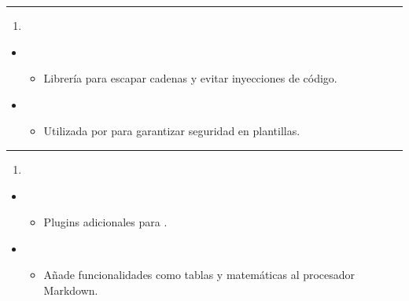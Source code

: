 \documentclass[a4paper,10pt,spanish]{sphinxmanual}
\begin{document}
\bigskip\hrule\bigskip

\begin{enumerate}
%
\setcounter{enumi}{10}
\item {} 
\sphinxAtStartPar
{}

\end{enumerate}
\begin{itemize}
\item {} 
\sphinxAtStartPar
{}
\begin{itemize}
\item {} 
\sphinxAtStartPar
Librería para escapar cadenas y evitar inyecciones de código.

\end{itemize}

\item {} 
\sphinxAtStartPar
{}
\begin{itemize}
\item {} 
\sphinxAtStartPar
Utilizada por  para garantizar seguridad en plantillas.

\end{itemize}

\end{itemize}


\bigskip\hrule\bigskip

\begin{enumerate}
%
\setcounter{enumi}{11}
\item {} 
\sphinxAtStartPar
{}

\end{enumerate}
\begin{itemize}
\item {} 
\sphinxAtStartPar
{}
\begin{itemize}
\item {} 
\sphinxAtStartPar
Plugins adicionales para .

\end{itemize}

\item {} 
\sphinxAtStartPar
{}
\begin{itemize}
\item {} 
\sphinxAtStartPar
Añade funcionalidades como tablas y matemáticas al procesador Markdown.

\end{itemize}

\end{itemize}
\end{document}
